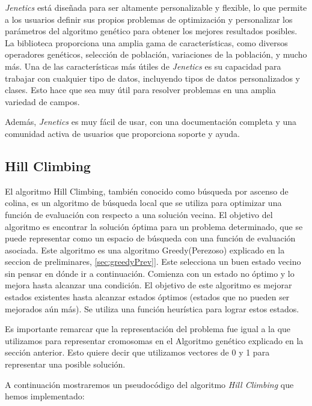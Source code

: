 
\emph{Jenetics} está diseñada para ser altamente personalizable y flexible, lo que permite a los usuarios definir sus propios problemas de optimización y personalizar los parámetros del algoritmo genético para obtener los mejores resultados posibles. La biblioteca proporciona una amplia gama de características, como diversos operadores genéticos, selección de población, variaciones de la población, y mucho más.
Una de las características más útiles de \emph{Jenetics} es su capacidad para trabajar con cualquier tipo de datos, incluyendo tipos de datos personalizados y clases. Esto hace que sea muy útil para resolver problemas en una amplia variedad de campos.

Además, \emph{Jenetics} es muy fácil de usar, con una documentación completa y una comunidad activa de usuarios que proporciona soporte y ayuda. 



\subsection{Hill Climbing}
\label{alg:approachHC}
El algoritmo Hill Climbing, también conocido como búsqueda por ascenso de colina\cite{Russell:2009}, es un algoritmo de búsqueda local que se utiliza para optimizar una función de evaluación con respecto a una solución vecina. El objetivo del algoritmo es encontrar la solución óptima para un problema determinado, que se puede representar como un espacio de búsqueda con una función de evaluación asociada.
Este algoritmo es una algoritmo Greedy(Perezoso) explicado en la seccion de preliminares, \ref{sec:greedyPrev}]. Este selecciona un buen estado vecino sin pensar en dónde ir a continuación. Comienza con un estado no óptimo y lo mejora hasta alcanzar una condición. El objetivo de este algoritmo es mejorar estados existentes hasta alcanzar estados óptimos (estados que no pueden ser mejorados aún más). Se utiliza una función heurística para lograr estos estados.

Es importante remarcar que la representación del problema fue igual a la que utilizamos para representar cromosomas en el Algoritmo genético explicado en la sección anterior. Esto quiere decir que utilizamos vectores de 0 y 1 para representar una posible solución. 

A continuación mostraremos un pseudocódigo del algoritmo \emph{Hill Climbing} que hemos implementado:

